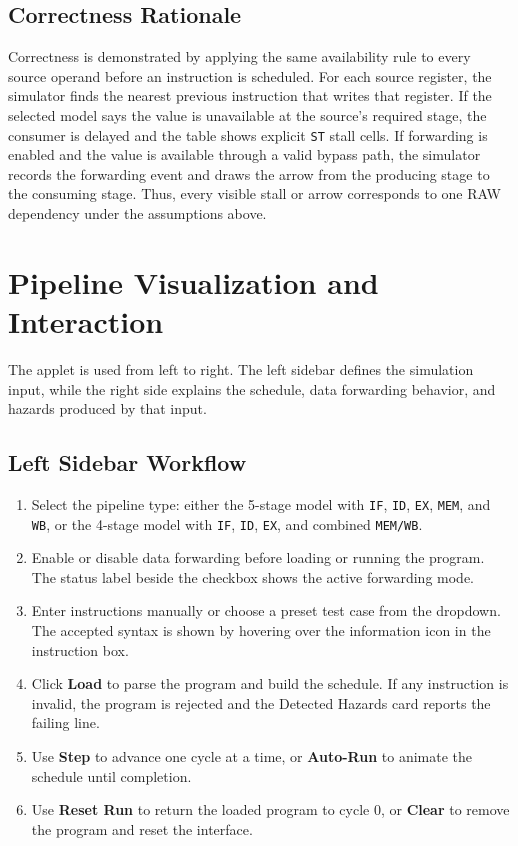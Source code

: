 \documentclass[11pt,a4paper]{article}
\begin{document}
\subsection*{Correctness Rationale}

Correctness is demonstrated by applying the same availability rule to every source operand before an instruction is scheduled. For each source register, the simulator finds the nearest previous instruction that writes that register. If the selected model says the value is unavailable at the source's required stage, the consumer is delayed and the table shows explicit \texttt{ST} stall cells. If forwarding is enabled and the value is available through a valid bypass path, the simulator records the forwarding event and draws the arrow from the producing stage to the consuming stage. Thus, every visible stall or arrow corresponds to one RAW dependency under the assumptions above.

\section{Pipeline Visualization and Interaction}

The applet is used from left to right. The left sidebar defines the simulation input, while the right side explains the schedule, data forwarding behavior, and hazards produced by that input.

\subsection*{Left Sidebar Workflow}

\begin{enumerate}[leftmargin=*]
    \item Select the pipeline type: either the 5-stage model with \texttt{IF}, \texttt{ID}, \texttt{EX}, \texttt{MEM}, and \texttt{WB}, or the 4-stage model with \texttt{IF}, \texttt{ID}, \texttt{EX}, and combined \texttt{MEM/WB}.
    \item Enable or disable data forwarding before loading or running the program. The status label beside the checkbox shows the active forwarding mode.
    \item Enter instructions manually or choose a preset test case from the dropdown. The accepted syntax is shown by hovering over the information icon in the instruction box.
    \item Click \textbf{Load} to parse the program and build the schedule. If any instruction is invalid, the program is rejected and the Detected Hazards card reports the failing line.
    \item Use \textbf{Step} to advance one cycle at a time, or \textbf{Auto-Run} to animate the schedule until completion.
    \item Use \textbf{Reset Run} to return the loaded program to cycle 0, or \textbf{Clear} to remove the program and reset the interface.
\end{enumerate}
\end{document}
